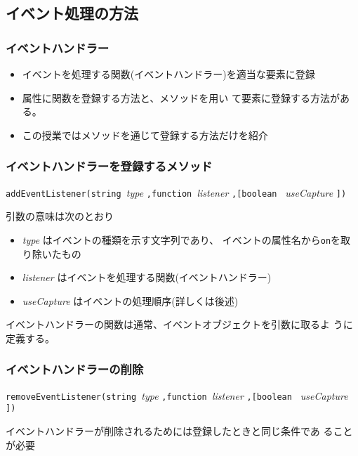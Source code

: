 \subsection{イベント処理の方法}
\begin{frame}[containsverbatim]
\frametitle{イベントハンドラー}
\begin{itemize}
 \item イベントを処理する関数(イベントハンドラー)を適当な要素に登録
 \item 属性に関数を登録する方法と、メソッドを用い
て要素に登録する方法がある。
 \item この授業ではメソッドを通じて登録する方法だけを紹介
\end{itemize}
\end{frame}
\begin{frame}[containsverbatim]
\frametitle{イベントハンドラーを登録するメソッド}
\texttt{addEventListener(string }{\sl type}
\texttt{,function }{\sl listener}
\texttt{,[boolean }
{\sl useCapture}
\texttt{])}

引数の意味は次のとおり
\begin{itemize}
 \item {\sl type} はイベントの種類を示す文字列であり、
イベントの属性名から\texttt{on}を取り除いたもの
 \item {\sl listener} はイベントを処理する関数(イベントハンドラー)
 \item {\sl useCapture} はイベントの処理順序(詳しくは後述)
\end{itemize}
イベントハンドラーの関数は通常、イベントオブジェクトを引数に取るよ
うに定義する。
\end{frame}
\begin{frame}[containsverbatim]
\frametitle{イベントハンドラーの削除}
\texttt{removeEventListener(string }{\sl type}
\texttt{,function }{\sl listener}
\texttt{,[boolean }
{\sl useCapture}
\texttt{])}

イベントハンドラーが削除されるためには登録したときと同じ条件であ
ることが必要
\end{frame}

